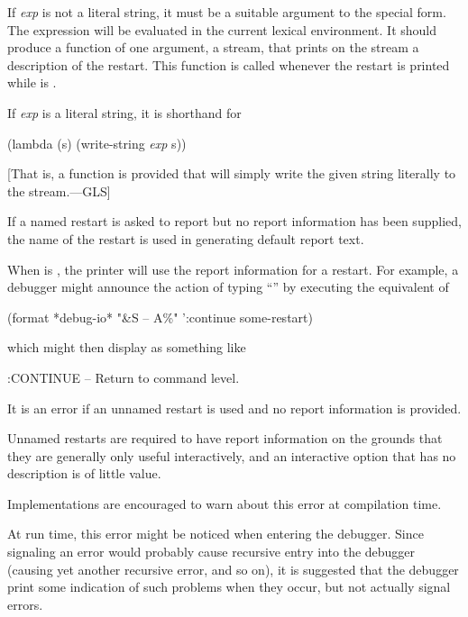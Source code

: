 \begin{defmac}
\begin{flushdesc}
    If {\it exp} is not a literal string, it must be a suitable argument to the
     special form. The expression  will be evaluated
    in the current lexical environment. It should produce a function of one
    argument, a stream, that prints on the stream a description of the
    restart. This function is called whenever the restart is printed while
     is .

    If {\it exp} is a literal string, it is shorthand for
\begin{lisp}
(lambda (s) (write-string {\it exp} s))
\end{lisp}
[That is, a function is provided that will simply write the given string literally
to the stream.---GLS]

    If a named restart is asked to report but no report information has been
    supplied, the name of the restart is used in generating default report text.

    When  is , the printer will use the report information for
    a restart. For example, a debugger might announce the action of typing
    ``'' by executing the equivalent of
\begin{lisp}
(format *debug-io* "{\Xtilde}\&{\Xtilde}S -- {\Xtilde}A{\Xtilde}\%" ':continue some-restart)
\end{lisp}
    which might then display as something like
\begin{lisp}
:CONTINUE -- Return to command level.
\end{lisp}

    It is an error if an unnamed restart is used and no report information
    is provided.

\beforenoterule
    \begin{rationale}
    Unnamed restarts are required to have report information
    on the grounds that they are generally only useful interactively,
    and an interactive option that has no description is of little value.
    \end{rationale}
\betweennoterule
\begin{implementation}
      Implementations are encouraged to warn about this error at compilation time.

      At run time, this error might be noticed when entering
      the debugger. Since signaling an error would probably cause recursive
      entry into the debugger (causing yet another recursive error, and so on), it is
      suggested that the debugger print some indication of such problems when
      they occur, but not actually signal errors.
\end{implementation}
\afternoterule
\end{flushdesc}


\end{defmac}
